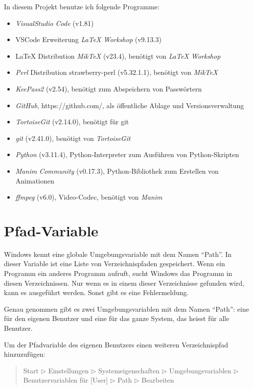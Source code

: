 \documentclass[a4paper]{article} %
\begin{document}
    In diesem Projekt benutze ich folgende Programme:
    \begin{itemize}
        \item \textsl{VisualStudio Code} (v1.81)
        \item VSCode Erweiterung \textsl{LaTeX Workshop} (v9.13.3)
        \item LaTeX Distribution \textsl{MikTeX} (v23.4), benötigt von \textsl{LaTeX Workshop}
        \item \textsl{Perl} Distribution strawberry-perl (v5.32.1.1), benötigt von \textsl{MikTeX}
        \item \textsl{KeePass2} (v2.54), benötigt zum Abspeichern von Passwörtern
        \item \textsl{GitHub}, https://github.com/, als öffentliche Ablage und Versionsverwaltung
        \item \textsl{TortoiseGit} (v2.14.0), benötigt für git
        \item \textsl{git} (v2.41.0), benötigt von \textsl{TortoiseGit}
        \item \textsl{Python} (v3.11.4), Python-Interpreter zum Ausführen von Python-Skripten 
        \item \textsl{Manim Community} (v0.17.3), Python-Bibliothek 
        zum Erstellen von Animationen
        \item \textsl{ffmpeg} (v6.0), Video-Codec, benötigt von \textsl{Manim} 
    \end{itemize}

    \section{Pfad-Variable} %
    Windows kennt eine globale Umgebungsvariable mit dem Namen ``Path''.
    In dieser Variable ist eine Liste von Verzeichnispfaden gespeichert.
    Wenn ein Programm ein anderes Programm aufruft, 
    sucht Windows das Programm in diesen Verzeichnissen.
    Nur wenn es in einem dieser Verzeichnisse gefunden wird,
    kann es ausgeführt werden.
    Sonst gibt es eine Fehlermeldung.

    Genau genommen gibt es zwei Umgebungsvariablen mit dem Namen ``Path'':
    eine für den eigenen Benutzer und eine für das ganze System,
    das heisst für alle Benutzer.

    Um der Pfadvariable des eigenen Benutzers einen weiteren Verzeichnispfad hinzuzufügen:
    \begin{quote}
        Start $\triangleright$ Einstellungen $\triangleright$
        Systemeigenschaften $\triangleright$ Umgebungsvariablen
        $\triangleright$ Benutzervariablen für [User] $\triangleright$
        Path $\triangleright$ Bearbeiten
    \end{quote}
\end{document}
